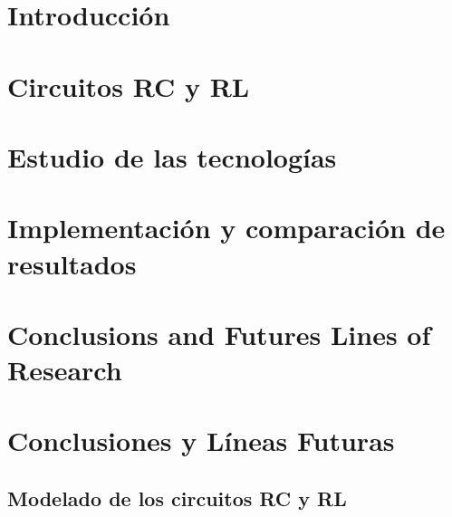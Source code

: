 \documentclass[12pt, a4paper, twoside]{article}
\begin{document}


\clearpage
\setcounter{page}{1}



\newpage



\newpage



\tableofcontents

\section{Introducción}


\section{Circuitos RC y RL}


\section{Estudio de las tecnologías}


\section{Implementación y comparación de resultados}


\section{Conclusions and Futures Lines of Research}


\section{Conclusiones y Líneas Futuras}



\printbibliography

\newpage


\begin{umaappendices}
  \section{Modelado de los circuitos RC y RL}
  
\end{umaappendices}
\end{document}
